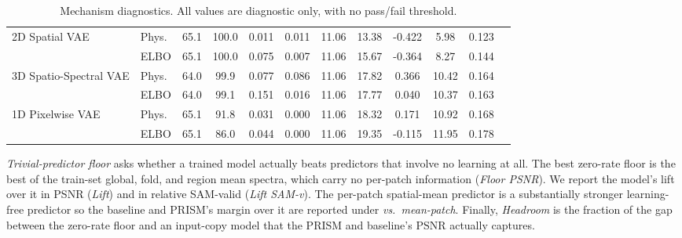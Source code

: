 \documentclass[twoside,11pt]{article}
\begin{document}
\begin{table}[t]
{\begin{tabular}{llcccccccccc}
    \midrule
    \multirow{2}{*}{2D Spatial VAE}         & Phys. & 65.1 & 100.0 & 0.011 & 0.011 & 11.06 & 13.38 & -0.422 & 5.98 & 0.123 \\
                                            & ELBO  & 65.1 & 100.0 & 0.075 & 0.007 & 11.06 & 15.67 & -0.364 & 8.27 & 0.144 \\
    \midrule
    \multirow{2}{*}{3D Spatio-Spectral VAE} & Phys. & 64.0 & 99.9  & 0.077 & 0.086 & 11.06 & 17.82 & 0.366 & 10.42 & 0.164 \\
                                            & ELBO  & 64.0 & 99.1  & 0.151 & 0.016 & 11.06 & 17.77 & 0.040 & 10.37 & 0.163 \\
    \midrule
    \multirow{2}{*}{1D Pixelwise VAE}       & Phys. & 65.1 & 91.8  & 0.031 & 0.000 & 11.06 & 18.32 & 0.171  & 10.92 & 0.168 \\
                                            & ELBO  & 65.1 & 86.0  & 0.044 & 0.000 & 11.06 & 19.35 & -0.115 & 11.95 & 0.178 \\
    \bottomrule
  \end{tabular}
  }
  \caption{Mechanism diagnostics. All values are diagnostic only, with no pass/fail threshold.}
  \label{tab:diagnostics}
\end{table}

\emph{Trivial-predictor floor} asks whether a trained model actually beats predictors that involve no learning at all. The best zero-rate floor is the best of the train-set global, fold, and region mean spectra, which carry no per-patch information (\emph{Floor PSNR}). We report the model's lift over it in PSNR (\emph{Lift}) and in relative SAM-valid (\emph{Lift SAM-v}). The per-patch spatial-mean predictor is a substantially stronger learning-free predictor so the baseline and PRISM's margin over it are reported under \emph{vs.\ mean-patch}. Finally, \emph{Headroom} is the fraction of the gap between the zero-rate floor and an input-copy model that the PRISM and baseline's PSNR actually captures.
\end{document}
